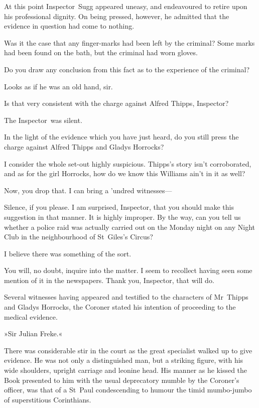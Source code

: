 At this point Inspector~Sugg appeared uneasy, and endeavoured to retire upon his professional dignity. On being pressed, however, he admitted that the evidence in question had come to nothing.

\begin{dialogue}
 Was it the case that any finger-marks had been left by the criminal?
Some marks had been found on the bath, but the criminal had worn gloves.

 Do you draw any conclusion from this fact as to the experience of the criminal?

 Looks as if he was an old hand, sir.

 Is that very consistent with the charge against Alfred Thipps, Inspector?

The Inspector~was silent.

 In the light of the evidence which you have just heard, do you still press the charge against Alfred Thipps and Gladys Horrocks?

 I consider the whole set-out highly suspicious. Thipps's story isn't corroborated, and as for the girl Horrocks, how do we know this Williams ain't in it as well?

 Now, you drop that. I can bring a 'undred witnesses—

 Silence, if you please. I am surprised, Inspector, that you should make this suggestion in that manner. It is highly improper. By the way, can you tell us whether a police raid was actually carried out on the Monday night on any Night Club in the neighbourhood of St~Giles's Circus?

  I believe there was something of the sort.

 You will, no doubt, inquire into the matter. I seem to recollect having seen some mention of it in the newspapers. Thank you, Inspector, that will do.
\end{dialogue}

Several witnesses having appeared and testified to the characters of Mr~Thipps and Gladys Horrocks, the Coroner stated his intention of proceeding to the medical evidence.

»Sir Julian Freke.«

There was considerable stir in the court as the great specialist walked up to give evidence. He was not only a distinguished man, but a striking figure, with his wide shoulders, upright carriage and leonine head. His manner as he kissed the Book presented to him with the usual deprecatory mumble by the Coroner's officer, was that of a St~Paul condescending to humour the timid mumbo-jumbo of superstitious Corinthians.

